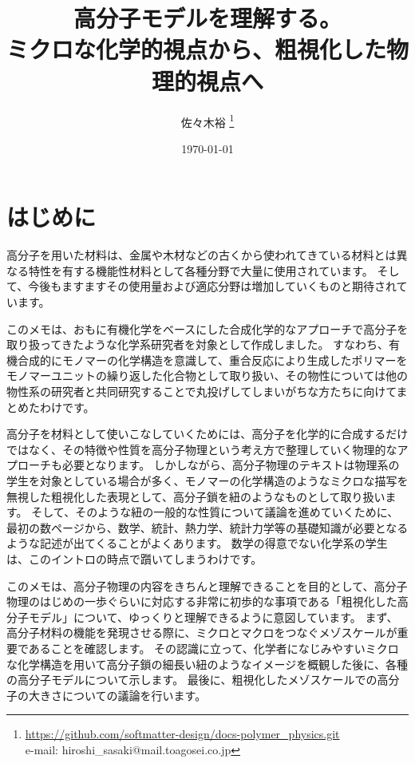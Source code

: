 \documentclass[uplatex,dvipdfmx,a4paper,11pt, titlepage]{jsarticle}
\title{高分子モデルを理解する。\\ミクロな化学的視点から、粗視化した物理的視点へ}
\author{佐々木裕 \thanks{\url{https://github.com/softmatter-design/docs-polymer_physics.git}\\e-mail: hiroshi\_sasaki$@$mail.toagosei.co.jp}}
\date{\today}
\begin{document}
\maketitle

\setcounter{tocdepth}{2}
\tableofcontents

\newpage

\setcounter{secnumdepth}{3}

\section*{はじめに}

高分子を用いた材料は、金属や木材などの古くから使われてきている材料とは異なる特性を有する機能性材料として各種分野で大量に使用されています。
そして、今後もますますその使用量および適応分野は増加していくものと期待されています。

このメモは、おもに有機化学をベースにした合成化学的なアプローチで高分子を取り扱ってきたような化学系研究者を対象として作成しました。
すなわち、有機合成的にモノマーの化学構造を意識して、重合反応により生成したポリマーをモノマーユニットの繰り返した化合物として取り扱い、その物性については他の物性系の研究者と共同研究することで丸投げしてしまいがちな方たちに向けてまとめたわけです。

高分子を材料として使いこなしていくためには、高分子を化学的に合成するだけではなく、その特徴や性質を高分子物理という考え方で整理していく物理的なアプローチも必要となります。
しかしながら、高分子物理のテキストは物理系の学生を対象としている場合が多く、モノマーの化学構造のようなミクロな描写を無視した粗視化した表現として、高分子鎖を紐のようなものとして取り扱います。
そして、そのような紐の一般的な性質について議論を進めていくために、最初の数ページから、数学、統計、熱力学、統計力学等の基礎知識が必要となるような記述が出てくることがよくあります。
数学の得意でない化学系の学生は、このイントロの時点で躓いてしまうわけです。

このメモは、高分子物理の内容をきちんと理解できることを目的として、高分子物理のはじめの一歩ぐらいに対応する非常に初歩的な事項である「粗視化した高分子モデル」について、ゆっくりと理解できるように意図しています。
まず、高分子材料の機能を発現させる際に、ミクロとマクロをつなぐメゾスケールが重要であることを確認します。
その認識に立って、化学者になじみやすいミクロな化学構造を用いて高分子鎖の細長い紐のようなイメージを概観した後に、各種の高分子モデルについて示します。
最後に、粗視化したメゾスケールでの高分子の大きさについての議論を行います。
\end{document}
